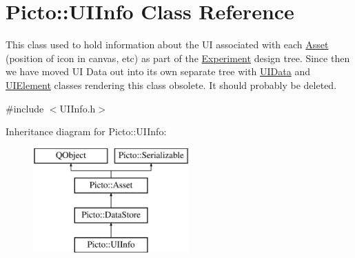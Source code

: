 \hypertarget{class_picto_1_1_u_i_info}{\section{Picto\-:\-:U\-I\-Info Class Reference}
\label{class_picto_1_1_u_i_info}
}


This class used to hold information about the U\-I associated with each \hyperlink{class_picto_1_1_asset}{Asset} (position of icon in canvas, etc) as part of the \hyperlink{class_picto_1_1_experiment}{Experiment} design tree. Since then we have moved U\-I Data out into its own separate tree with \hyperlink{class_picto_1_1_u_i_data}{U\-I\-Data} and \hyperlink{class_picto_1_1_u_i_element}{U\-I\-Element} classes rendering this class obsolete. It should probably be deleted.  




{\ttfamily \#include $<$U\-I\-Info.\-h$>$}

Inheritance diagram for Picto\-:\-:U\-I\-Info\-:\begin{figure}[H]
\begin{center}
\leavevmode
\includegraphics[height=4.000000cm]{class_picto_1_1_u_i_info}
\end{center}
\end{figure}
